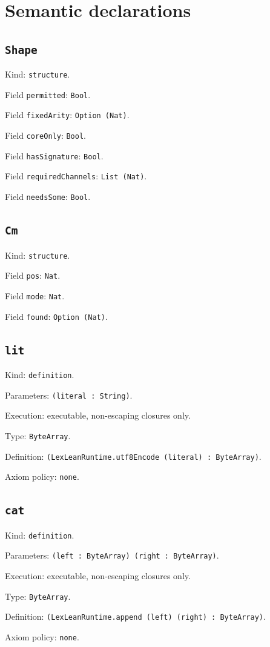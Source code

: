 \documentclass[11pt]{article}
\begin{document}
\section*{Semantic declarations}
\subsection*{\texttt{Shape}}
\noindent Kind: \texttt{structure}.\par
\noindent Field \texttt{permitted}: \texttt{Bool}.\par
\noindent Field \texttt{fixedArity}: \texttt{Option (Nat)}.\par
\noindent Field \texttt{coreOnly}: \texttt{Bool}.\par
\noindent Field \texttt{hasSignature}: \texttt{Bool}.\par
\noindent Field \texttt{requiredChannels}: \texttt{List (Nat)}.\par
\noindent Field \texttt{needsSome}: \texttt{Bool}.\par
\subsection*{\texttt{Cm}}
\noindent Kind: \texttt{structure}.\par
\noindent Field \texttt{pos}: \texttt{Nat}.\par
\noindent Field \texttt{mode}: \texttt{Nat}.\par
\noindent Field \texttt{found}: \texttt{Option (Nat)}.\par
\subsection*{\texttt{lit}}
\noindent Kind: \texttt{definition}.\par
\noindent Parameters: \texttt{(literal : String)}.\par
\noindent Execution: executable, non-escaping closures only.\par
\noindent Type: \texttt{ByteArray}.\par
\noindent Definition: \texttt{(LexLeanRuntime.utf8Encode (literal) : ByteArray)}.\par
\noindent Axiom policy: \texttt{none}.\par
\subsection*{\texttt{cat}}
\noindent Kind: \texttt{definition}.\par
\noindent Parameters: \texttt{(left : ByteArray) (right : ByteArray)}.\par
\noindent Execution: executable, non-escaping closures only.\par
\noindent Type: \texttt{ByteArray}.\par
\noindent Definition: \texttt{(LexLeanRuntime.append (left) (right) : ByteArray)}.\par
\noindent Axiom policy: \texttt{none}.\par
\end{document}
